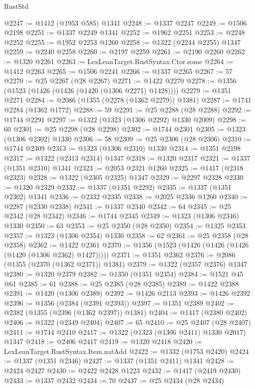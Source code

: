 \begin{lexlean}{RustStd}
\begin{coremodule}
{\begin{coremodule}
{{{{{{{{{{{{{{{{{{{{{{{{{{{{{{{{{{@2247 := @1412 (@1953 @585) @1341
@2248 := @1337 @2247
@2249 := @1506 @2198
@2251 := @1337 @2249 @1341
@2252 := @1962 @2251
@2253 := @2248 @2252
@2255 := @1952 @2253 @1260
@2258 := @1322 (@2244 @2255) @1347
@2259 := @2240 @2258
@2260 := @2197 @2259
@2261 := @2190 @2260
@2262 := @1320 @2261
@2263 := LexLeanTarget.RustSyntax.Ctor.some
@2264 := @1412 @2263
@2265 := @1506 @2241
@2266 := @1337 @2265
@2267 := 57
@2270 := @25 @2267 (@28 @2267)
@2271 := @1422 @2270
@2278 := @1356 (@1523 (@1426 (@1426 (@1420 (@1306 @2271) @1428))))
@2279 := @1351 @2271
@2284 := @2086 (@1355 (@2278 (@1362 @2279)) @1381)
@2287 := @1741 @2284 (@1362 @1772)
@2288 := 59
@2291 := @25 @2288 (@28 @2288)
@2292 := @1744 @2291
@2297 := @1322 (@1323 (@1306 @2292) @1330 @2009)
@2298 := 60
@2301 := @25 @2298 (@28 @2298)
@2302 := @1744 @2301
@2305 := @1323 (@1306 @2302) @1330
@2306 := 58
@2309 := @25 @2306 (@28 @2306)
@2310 := @1744 @2309
@2313 := @1323 (@1306 @2310) @1330
@2314 := @1351 @2198
@2317 := @1322 (@2313 @2314) @1347
@2318 := @1320 @2317
@2321 := @1337 (@1351 @2310) @1341
@2323 := @2053 @2321 @1260
@2325 := @1417 (@2318 @2323)
@2328 := @1322 (@2305 @2325) @1347
@2329 := @2297 @2328
@2330 := @1320 @2329
@2332 := @1337 (@1351 @2292)
@2335 := @1337 (@1351 @2302) @1341
@2336 := @2332 @2335
@2338 := @2025 @2336 @1260
@2340 := @2287 (@2330 @2338)
@2341 := @1337 @2340
@2342 := 64
@2345 := @25 @2342 (@28 @2342)
@2346 := @1744 @2345
@2349 := @1323 (@1306 @2346) @1330
@2350 := 63
@2353 := @25 @2350 (@28 @2350)
@2354 := @1325 @2353
@2357 := @1323 (@1306 @2354) @1330
@2358 := 62
@2361 := @25 @2358 (@28 @2358)
@2362 := @1422 @2361
@2370 := @1356 (@1523 (@1426 (@1426 (@1426 (@1420 (@1306 @2362) @1427)))))
@2371 := @1351 @2362
@2376 := @2086 (@1355 (@2370 (@1362 @2371)) @1381)
@2379 := @1322 (@2357 @2376) @1347
@2380 := @1320 @2379
@2382 := @1350 (@1351 @2354)
@2384 := @1521 @45 @61
@2385 := 61
@2388 := @25 @2385 (@28 @2385)
@2389 := @1422 @2388
@2391 := @1420 (@1306 @2389)
@2392 := @1426 @2113
@2393 := @1426 @2392
@2396 := @1356 (@2384 (@2391 @2393))
@2397 := @1351 @2389
@2402 := @2382 (@1355 (@2396 (@1362 @2397)) @1381)
@2404 := @1417 (@2380 @2402)
@2406 := @1322 (@2349 @2404)
@2407 := 65
@2410 := @25 @2407 (@28 @2407)
@2411 := @1744 @2410
@2417 := @1322 (@1323 (@1306 @2411) @1330 @2017) @1347
@2418 := @2406 @2417
@2419 := @1320 @2418
@2420 := LexLeanTarget.RustSyntax.Item.natAdd
@2422 := @1332 (@1753 @2420)
@2424 := @1337 (@1351 @2346)
@2427 := @1337 (@1351 @2411) @1341
@2428 := @2424 @2427
@2430 := @2422 @2428 @1223
@2432 := @1417 (@2419 @2430)
@2433 := @1337 @2432
@2434 := 70
@2437 := @25 @2434 (@28 @2434)
}}}}}}}}}}}}}}}}}}}}}}}}}}}}}}}}}}
\end{coremodule}}
\end{coremodule}
\end{lexlean}
